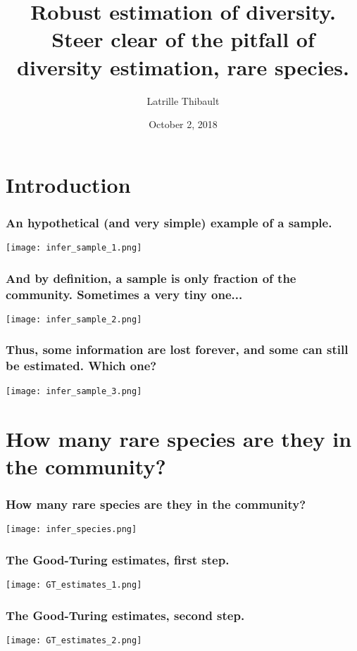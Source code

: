 \documentclass[10pt]{beamer}
\date{October 2, 2018}
\author{Latrille Thibault}
\title{Robust estimation of diversity. Steer clear of the pitfall of diversity estimation, rare species.}
\begin{document}
\frame{\titlepage} 

\section{Introduction}

\begin{frame}
\frametitle{An hypothetical (and very simple) example of a sample.}
	\begin{center}
       \texttt{[image: infer\_sample\_1.png]}
	\end{center}
\end{frame}

\begin{frame}
\frametitle{And by definition, a sample is only fraction of the community. Sometimes a very tiny one...}
	\begin{center}
       \texttt{[image: infer\_sample\_2.png]}
	\end{center}
\end{frame}

\begin{frame}
\frametitle{Thus, some information are lost forever, and some can still be estimated. Which one?}
	\begin{center}
       \texttt{[image: infer\_sample\_3.png]}
	\end{center}
\end{frame}


\section{How many rare species are they in the community?}

\begin{frame}
\frametitle{How many rare species are they in the community?}
	\begin{center}
       \texttt{[image: infer\_species.png]}
	\end{center}
	
\end{frame}


\begin{frame}
\frametitle{The Good-Turing estimates, first step.}
	\begin{center}
       \texttt{[image: GT\_estimates\_1.png]}
	\end{center}
\end{frame}

\begin{frame}
\frametitle{The Good-Turing estimates, second step.}
	\begin{center}
       \texttt{[image: GT\_estimates\_2.png]}
	\end{center}
\end{frame}
\end{document}
